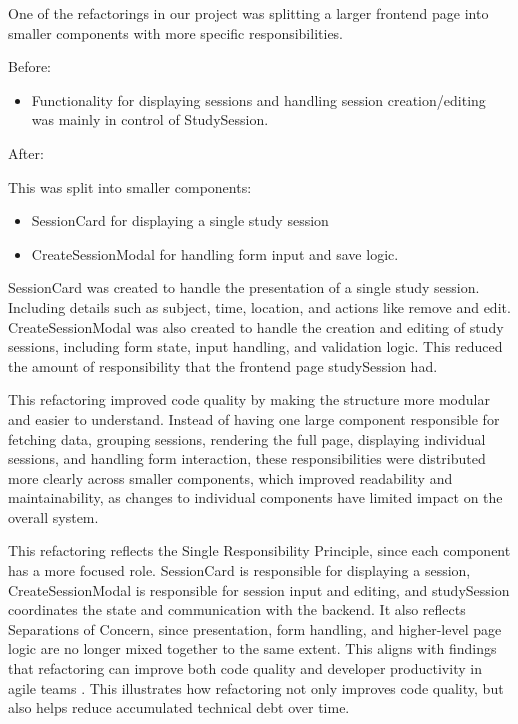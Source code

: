 One of the refactorings in our project was splitting a
larger frontend page into smaller components with more specific responsibilities.

Before:

\begin{itemize}
\item Functionality for displaying sessions and handling session creation/editing was mainly in control of StudySession.


\end{itemize}

After:

This was split into smaller components:

\begin{itemize}
\item SessionCard for displaying a single study session

\item CreateSessionModal for handling form input and save logic.

\end{itemize}

SessionCard was created to handle the presentation of a single study session.
Including details such as subject, time, location, and actions like remove and edit.
CreateSessionModal was also created to handle the creation and editing of study sessions,
including form state, input handling, and validation logic.
This reduced the amount of responsibility that the frontend page studySession had.

This refactoring improved code quality by making the structure more modular and easier to understand.
Instead of having one large component responsible for fetching data, grouping sessions, rendering the full page,
displaying individual sessions, and handling form interaction, these responsibilities were distributed
more clearly across smaller components,
which improved readability and maintainability,
as changes to individual components have limited impact on the overall system.

This refactoring reflects the Single Responsibility Principle, since each component has a more focused role.
SessionCard is responsible for displaying a session, CreateSessionModal is responsible for session input and editing,
and studySession coordinates the state and communication with the backend.
It also reflects Separations of Concern, since presentation, form handling,
and higher-level page logic are no longer mixed together to the same extent.
This aligns with findings that refactoring can improve both code quality and developer productivity in agile teams \cite{Impact_of_Refactoring}.
This illustrates how refactoring not only improves code quality, but also helps reduce accumulated technical debt over time.